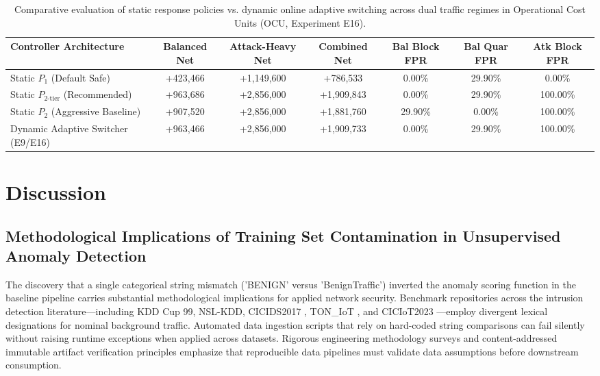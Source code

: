 \documentclass[journal,10pt,onecolumn]{IEEEtran}
\begin{document}
\begin{table}[t]
\caption{Comparative evaluation of static response policies vs. dynamic online adaptive switching across dual traffic regimes in Operational Cost Units (OCU, Experiment E16).}
\label{tab:dynamic_switcher}
\centering
\small
\begin{tabular}{lcccccc}
\toprule
\textbf{Controller Architecture} & \textbf{Balanced Net} & \textbf{Attack-Heavy Net} & \textbf{Combined Net} & \textbf{Bal Block FPR} & \textbf{Bal Quar FPR} & \textbf{Atk Block FPR} \\
\midrule
Static $P_1$ (Default Safe) & +423,466 & +1,149,600 & +786,533 & 0.00\% & 29.90\% & 0.00\% \\
Static $P_{2\text{-tier}}$ (Recommended) & +963,686 & +2,856,000 & +1,909,843 & 0.00\% & 29.90\% & 100.00\% \\
Static $P_2$ (Aggressive Baseline) & +907,520 & +2,856,000 & +1,881,760 & 29.90\% & 0.00\% & 100.00\% \\
Dynamic Adaptive Switcher (E9/E16) & +963,466 & +2,856,000 & +1,909,733 & 0.00\% & 29.90\% & 100.00\% \\
\bottomrule
\end{tabular}
\end{table}


\section{Discussion}


\subsection{Methodological Implications of Training Set Contamination in Unsupervised Anomaly Detection}
The discovery that a single categorical string mismatch ('BENIGN' versus 'BenignTraffic') inverted the anomaly scoring function in the baseline pipeline \cite{1} carries substantial methodological implications for applied network security. Benchmark repositories across the intrusion detection literature—including KDD Cup 99, NSL-KDD, CICIDS2017 \cite{39}, TON_IoT \cite{40}, and CICIoT2023 \cite{3}—employ divergent lexical designations for nominal background traffic. Automated data ingestion scripts that rely on hard-coded string comparisons can fail silently without raising runtime exceptions when applied across datasets. Rigorous engineering methodology surveys \cite{28} and content-addressed immutable artifact verification principles \cite{29} emphasize that reproducible data pipelines must validate data assumptions before downstream consumption.
\end{document}
